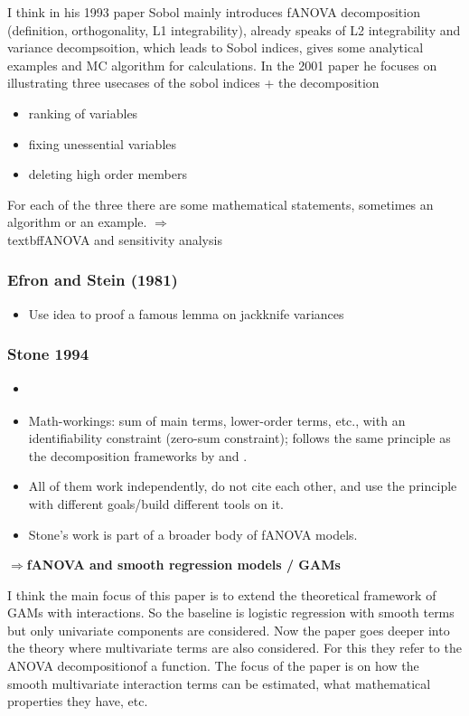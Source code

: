 I think in his 1993 paper Sobol mainly introduces fANOVA decomposition (definition, orthogonality, L1 integrability), already speaks of L2 integrability and variance decompsoition, which leads to Sobol indices, gives some analytical examples and MC algorithm for calculations.
In the 2001 paper he focuses on illustrating three usecases of the sobol indices + the decomposition\par
\begin{itemize}
    \item ranking of variables
    \item fixing unessential variables
    \item deleting high order members
\end{itemize}
For each of the three there are some mathematical statements, sometimes an algorithm or an example.
$\Rightarrow$\\textbf{fANOVA and sensitivity analysis}

\subsubsection*{Efron and Stein (1981)}
\begin{itemize}
    \item Use idea to proof a famous lemma on jackknife variances \citep{efron_jackknife_1981}
\end{itemize}

\subsubsection*{Stone 1994}
\begin{itemize}
    \item \cite{stone_use_1994}
    \item Math-workings: sum of main terms, lower-order terms, etc., with an identifiability constraint (zero-sum constraint); follows the same principle as the decomposition frameworks by \cite{hoeffding_class_1948} and \cite{sobol_global_2001}.
    \item All of them work independently, do not cite each other, and use the principle with different goals/build different tools on it.
    \item Stone's work is part of a broader body of fANOVA models.
\end{itemize}
$\Rightarrow$\textbf{fANOVA and smooth regression models / GAMs}\par
I think the main focus of this paper is to extend the theoretical framework of GAMs with interactions. So the baseline is logistic regression with smooth terms but only univariate components are considered.
Now the paper goes deeper into the theory where multivariate terms are also considered. For this they refer to the \ldq ANOVA decomposition\rdq of a function. The focus of the paper is on how the smooth multivariate interaction terms can be estimated, what mathematical properties they have, etc.


